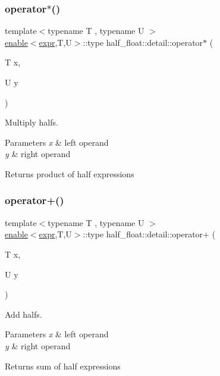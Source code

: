 \subsubsection{\texorpdfstring{operator$\ast$()}{operator*()}}
{\footnotesize\ttfamily template$<$typename T , typename U $>$ \\
\hyperlink{structhalf__float_1_1detail_1_1enable}{enable}$<$\hyperlink{structhalf__float_1_1detail_1_1expr}{expr},T,U$>$\+::type half\+\_\+float\+::detail\+::operator$\ast$ (\begin{DoxyParamCaption}\item[{T}]{x,  }\item[{U}]{y }\end{DoxyParamCaption})}

Multiply halfs. 
\begin{DoxyParams}{Parameters}
{\em x} & left operand \\
\hline
{\em y} & right operand \\
\hline
\end{DoxyParams}
\begin{DoxyReturn}{Returns}
product of half expressions 
\end{DoxyReturn}
\mbox{\label{namespacehalf__float_1_1detail_ab68ed4e1f0a86aebf4337957f1639070}} 
\subsubsection{\texorpdfstring{operator+()}{operator+()}\hspace{0.1cm}{\footnotesize\ttfamily [1/2]}}
{\footnotesize\ttfamily template$<$typename T , typename U $>$ \\
\hyperlink{structhalf__float_1_1detail_1_1enable}{enable}$<$\hyperlink{structhalf__float_1_1detail_1_1expr}{expr},T,U$>$\+::type half\+\_\+float\+::detail\+::operator+ (\begin{DoxyParamCaption}\item[{T}]{x,  }\item[{U}]{y }\end{DoxyParamCaption})}

Add halfs. 
\begin{DoxyParams}{Parameters}
{\em x} & left operand \\
\hline
{\em y} & right operand \\
\hline
\end{DoxyParams}
\begin{DoxyReturn}{Returns}
sum of half expressions 
\end{DoxyReturn}
\mbox{\label{namespacehalf__float_1_1detail_a7afa8822c81700c74bf8be208cded547}} 

